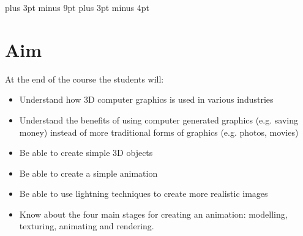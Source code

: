 \documentclass[11pt,a4paper]{article}
\begin{document}
\belowdisplayskip=12pt plus 3pt minus 9pt
\belowdisplayshortskip=7pt plus 3pt minus 4pt


% 
% 
% 
% 
% 
% 


\section{Aim}

At the end of the course the students will:
\begin{itemize}
 \item Understand how 3D computer graphics is used in various industries
 \item Understand the benefits of using computer generated graphics (e.g. saving money) instead of more traditional forms of graphics (e.g. photos, movies)
 \item Be able to create simple 3D objects
 \item Be able to create a simple animation
 \item Be able to use lightning techniques to create more realistic images
 \item Know about the four main stages for creating an animation: modelling, texturing, animating and rendering.
\end{itemize}
\end{document}
